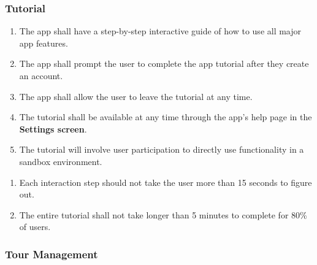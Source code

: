 \documentclass{article}
\begin{document}

\subsubsection{Tutorial}
\label{ssub:tutorial}

\begin{enumerate}[align=left, label=\textbf{TU-FR\arabic*:}]
    \item The app shall have a step-by-step interactive guide of how to use all major app features.
    \item The app shall prompt the user to complete the app tutorial after they create an account.
    \item The app shall allow the user to leave the tutorial at any time.
    \item The tutorial shall be available at any time through the app's help page in the \textbf{Settings screen}.
    \item The tutorial will involve user participation to directly use functionality in a sandbox environment.
\end{enumerate}

\begin{enumerate}[align=left, label=\textbf{TU-NFR\arabic*:}]
    \item Each interaction step should not take the user more than 15 seconds to figure out.
    \item The entire tutorial shall not take longer than 5 minutes to complete for 80\% of users.
\end{enumerate}

\subsubsection{Tour Management}
\label{ssub:tour_management}
\end{document}
